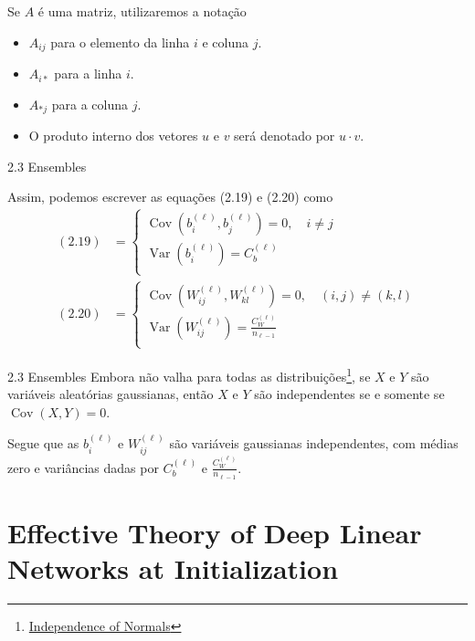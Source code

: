 \documentclass{beamer}
\DeclareMathOperator{\Cov}{Cov}
\DeclareMathOperator{\Var}{Var}
\begin{document}
\begin{frame}
	Se $A$ é uma matriz, utilizaremos a notação 
	\begin{itemize}
		\item $A_{ij}$ para o elemento da linha $i$ e coluna $j$.
		\item $A_{i*}$ para a linha $i$.	
		\item $A_{*j}$ para a coluna $j$.
		\item O produto interno dos vetores $u$ e $v$ será denotado por $u\cdot v$.
	\end{itemize}
\end{frame}
\begin{frame}{2.3 Ensembles}
	
	Assim, podemos escrever as equações (2.19) e (2.20) como
	\begin{align*}
		(2.19) &= \begin{cases}
		\Cov\left(b^{(\ell)}_{i},b^{(\ell)}_j\right) = 0, \quad i\neq j\\[1ex]
		\Var\left(b^{(\ell)}_{i}\right) = C_b^{(\ell)} \\
		\end{cases}  \tag{2.19'}\\[2ex] 
		(2.20) &= \begin{cases}
		\Cov\left(W^{(\ell)}_{ij},W^{(\ell)}_{kl}\right) = 0, \quad (i,j)\neq (k,l)\\[1ex]
		\Var\left(W^{(\ell)}_{ij}\right) = \frac{C_W^{(\ell)}}{n_{\ell-1}} \\
		\end{cases} \tag{2.20'}
	\end{align*}
\end{frame}

\begin{frame}{2.3 Ensembles}
	Embora não valha para todas as distribuições\footnote{\href{https://almostsuremath.com/2021/03/24/independence-of-normals/}{Independence of Normals}}, se $X$ e $Y$ são variáveis aleatórias gaussianas, então $X$ e $Y$ são independentes se e somente se $\Cov(X,Y) = 0$.  

	\medskip

	Segue que as $b^{(\ell)}_i$ e $W^{(\ell)}_{ij}$ são variáveis gaussianas independentes, com médias zero e variâncias dadas por $C_b^{(\ell)}$ e $\frac{C_W^{(\ell)}}{n_{\ell-1}}$.
\end{frame}

\section{Effective Theory of Deep Linear Networks at Initialization}
\end{document}
